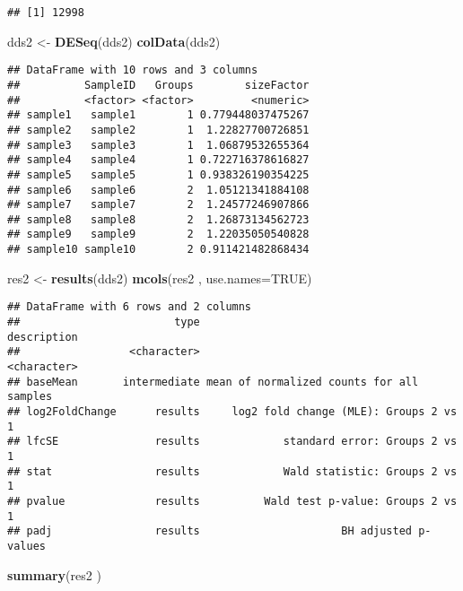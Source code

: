 \documentclass[]{article}
\newenvironment{Shaded}{\begin{snugshade}}{\end{snugshade}}
\newcommand{\DataTypeTok}[1]{\textcolor[rgb]{0.13,0.29,0.53}{#1}}
\newcommand{\KeywordTok}[1]{\textcolor[rgb]{0.13,0.29,0.53}{\textbf{#1}}}
\newcommand{\NormalTok}[1]{#1}
\newcommand{\OtherTok}[1]{\textcolor[rgb]{0.56,0.35,0.01}{#1}}
\newcommand{\StringTok}[1]{\textcolor[rgb]{0.31,0.60,0.02}{#1}}
\begin{document}
\begin{verbatim}
## [1] 12998
\end{verbatim}

\begin{Shaded}
\begin{Highlighting}[]
\NormalTok{dds2 <-}\StringTok{ }\KeywordTok{DESeq}\NormalTok{(dds2)}
\KeywordTok{colData}\NormalTok{(dds2)}
\end{Highlighting}
\end{Shaded}

\begin{verbatim}
## DataFrame with 10 rows and 3 columns
##          SampleID   Groups        sizeFactor
##          <factor> <factor>         <numeric>
## sample1   sample1        1 0.779448037475267
## sample2   sample2        1  1.22827700726851
## sample3   sample3        1  1.06879532655364
## sample4   sample4        1 0.722716378616827
## sample5   sample5        1 0.938326190354225
## sample6   sample6        2  1.05121341884108
## sample7   sample7        2  1.24577246907866
## sample8   sample8        2  1.26873134562723
## sample9   sample9        2  1.22035050540828
## sample10 sample10        2 0.911421482868434
\end{verbatim}

\begin{Shaded}
\begin{Highlighting}[]
\NormalTok{res2 <-}\StringTok{ }\KeywordTok{results}\NormalTok{(dds2)}
\KeywordTok{mcols}\NormalTok{(res2 , }\DataTypeTok{use.names=}\OtherTok{TRUE}\NormalTok{)}
\end{Highlighting}
\end{Shaded}

\begin{verbatim}
## DataFrame with 6 rows and 2 columns
##                        type                               description
##                 <character>                               <character>
## baseMean       intermediate mean of normalized counts for all samples
## log2FoldChange      results     log2 fold change (MLE): Groups 2 vs 1
## lfcSE               results             standard error: Groups 2 vs 1
## stat                results             Wald statistic: Groups 2 vs 1
## pvalue              results          Wald test p-value: Groups 2 vs 1
## padj                results                      BH adjusted p-values
\end{verbatim}

\begin{Shaded}
\begin{Highlighting}[]
\KeywordTok{summary}\NormalTok{(res2 )}
\end{Highlighting}
\end{Shaded}
\end{document}
